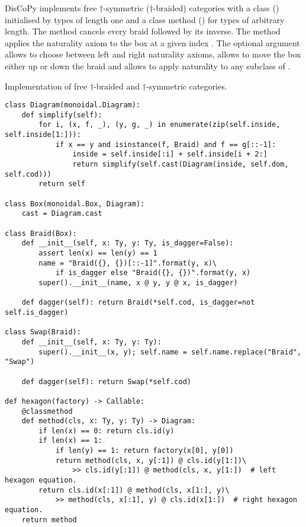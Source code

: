 DisCoPy implements free $\dagger$-symmetric ($\dagger$-braided) categories with a class  () initialised by types of length one and a class method  () for types of arbitrary length.
The method  cancels every braid followed by its inverse.
The  method applies the naturality axiom to the box at a given index .
The optional argument  allows to choose between left and right naturality axioms,  allows to move the box either up or down the braid and  allows to apply naturality to any subclass of .

\begin{python}
{\normalfont Implementation of free $\dagger$-braided and $\dagger$-symmetric categories.}

\begin{verbatim}
class Diagram(monoidal.Diagram):
    def simplify(self):
        for i, (x, f, _), (y, g, _) in enumerate(zip(self.inside, self.inside[1:])):
            if x == y and isinstance(f, Braid) and f == g[::-1]:
                inside = self.inside[:i] + self.inside[i + 2:]
                return simplify(self.cast(Diagram(inside, self.dom, self.cod)))
        return self

class Box(monoidal.Box, Diagram):
    cast = Diagram.cast

class Braid(Box):
    def __init__(self, x: Ty, y: Ty, is_dagger=False):
        assert len(x) == len(y) == 1
        name = "Braid({}, {})[::-1]".format(y, x)\
            if is_dagger else "Braid({}, {})".format(y, x)
        super().__init__(name, x @ y, y @ x, is_dagger)

    def dagger(self): return Braid(*self.cod, is_dagger=not self.is_dagger)

class Swap(Braid):
    def __init__(self, x: Ty, y: Ty):
        super().__init__(x, y); self.name = self.name.replace("Braid", "Swap")

    def dagger(self): return Swap(*self.cod)

def hexagon(factory) -> Callable:
    @classmethod
    def method(cls, x: Ty, y: Ty) -> Diagram:
        if len(x) == 0: return cls.id(y)
        if len(x) == 1:
            if len(y) == 1: return factory(x[0], y[0])
            return method(cls, x, y[:1]) @ cls.id(y[1:])\
                >> cls.id(y[:1]) @ method(cls, x, y[1:])  # left hexagon equation.
        return cls.id(x[:1]) @ method(cls, x[1:], y)\
            >> method(cls, x[:1], y) @ cls.id(x[1:])  # right hexagon equation.
    return method


\end{verbatim}
\end{python}
